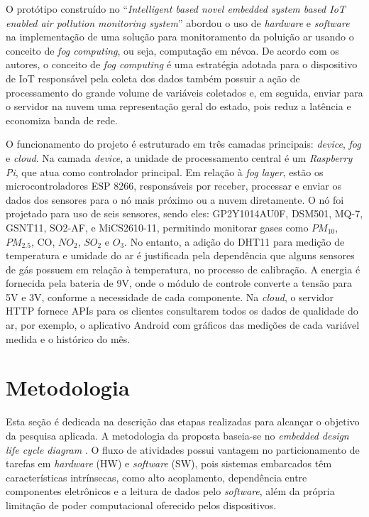 \documentclass[alpha-refs,brazilian]{RBCA_v3.0}
\begin{document}
O protótipo construído no ``\textit{Intelligent based novel embedded system based IoT enabled air pollution monitoring system}'' \citep{ref4:novel-embedded-system} abordou o uso de \textit{hardware} e \textit{software} na implementação 
de uma solução para monitoramento da poluição ar usando o conceito de \textit{fog computing}, ou seja, computação em névoa. De acordo com os autores, o conceito de 
\textit{fog computing} é uma estratégia adotada para o dispositivo de IoT responsável pela coleta dos dados também possuir a ação de processamento do grande volume de variáveis coletados e, 
em seguida, enviar para o servidor na nuvem uma representação geral do estado, pois reduz a latência e economiza banda de rede.

O funcionamento do projeto é estruturado em três camadas principais: \textit{device}, \textit{fog} e \textit{cloud}. Na camada \textit{device}, 
a unidade de processamento central é um \textit{Raspberry Pi}, que atua como controlador principal. Em relação à \textit{fog layer}, estão os microcontroladores ESP 8266, responsáveis por receber, processar e 
enviar os dados dos sensores para o nó mais próximo ou a nuvem diretamente. O nó foi projetado para uso de seis sensores, sendo eles: GP2Y1014AU0F, DSM501, MQ-7, GSNT11, SO2-AF,
e MiCS2610-11, permitindo monitorar gases como $PM_{10}$, ${PM_{2.5}}$, CO, $NO_{2}$, $SO_{2}$ e $O_{3}$. No entanto, a adição do DHT11 para medição de temperatura e umidade do ar é justificada 
pela dependência que alguns sensores de gás possuem em relação à temperatura, no processo de calibração. A energia é fornecida pela bateria de 9V, onde o módulo de controle converte a tensão para 5V e 3V, conforme a 
necessidade de cada componente. Na \textit{cloud}, o servidor HTTP fornece APIs para os clientes consultarem todos os dados de qualidade do ar, por exemplo, o aplicativo Android com 
gráficos das medições de cada variável medida e o histórico do mês.

\section{Metodologia}\label{sec02:metodologia}

Esta seção é dedicada na descrição das etapas realizadas para alcançar o objetivo da pesquisa aplicada. A metodologia da proposta 
baseia-se no \textit{embedded design life cycle diagram} \citep{metodologia-embedded-system}. O fluxo de atividades possui vantagem no 
particionamento de tarefas em \textit{hardware} (HW) e \textit{software} (SW), pois sistemas embarcados têm características intrínsecas, 
como alto acoplamento, dependência entre componentes eletrônicos e a leitura de dados pelo \textit{software}, além da própria limitação de 
poder computacional oferecido pelos dispositivos.
\end{document}
